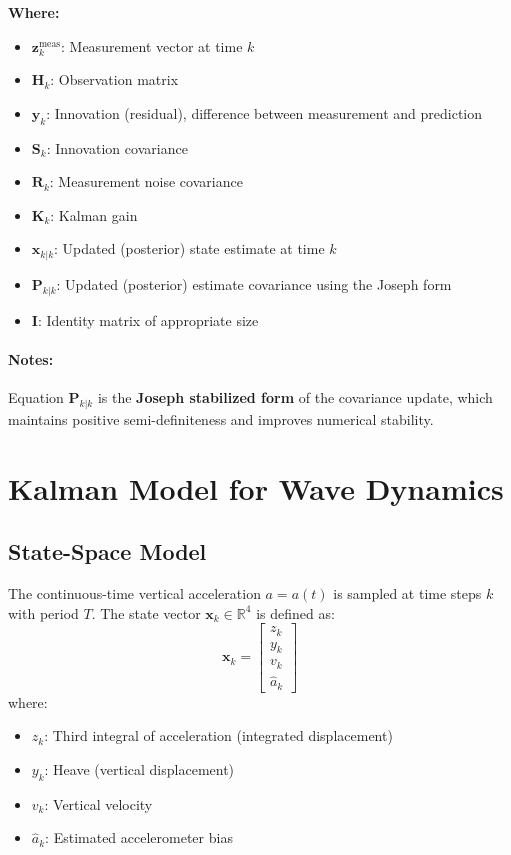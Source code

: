 \documentclass[11pt,letterpaper]{article}
\begin{document}
\textbf{Where:}
\begin{itemize}
  \item $\bm{z}^{\text{meas}}_k$: Measurement vector at time $k$
  \item $\mathbf{H}_k$: Observation matrix
  \item $\bm{y}_k$: Innovation (residual), difference between measurement and prediction
  \item $\mathbf{S}_k$: Innovation covariance
  \item $\mathbf{R}_k$: Measurement noise covariance
  \item $\mathbf{K}_k$: Kalman gain
  \item $\bm{x}_{k|k}$: Updated (posterior) state estimate at time $k$
  \item $\mathbf{P}_{k|k}$: Updated (posterior) estimate covariance using the Joseph form
  \item $\mathbf{I}$: Identity matrix of appropriate size
\end{itemize}

\paragraph{Notes:}
Equation \( {\mathbf{P}}_{k|k} \) is the \textbf{Joseph stabilized form} of the covariance update, which maintains positive semi-definiteness and improves numerical stability.



\section{Kalman Model for Wave Dynamics}

\subsection*{State-Space Model}
The continuous-time vertical acceleration \( a = a(t) \) is sampled at time steps \( k \) with period \( T \). The state vector \( \mathbf{x}_k \in \mathbb{R}^4 \) is defined as:
\begin{equation}
\mathbf{x}_k = \begin{bmatrix}
z_k \\
y_k \\
v_k \\
\hat{a}_k
\end{bmatrix}
\end{equation}
where:
\begin{itemize}
  \item \( z_k \): Third integral of acceleration (integrated displacement)
  \item \( y_k \): Heave (vertical displacement)
  \item \( v_k \): Vertical velocity
  \item \( \hat{a}_k \): Estimated accelerometer bias
\end{itemize}
\end{document}
